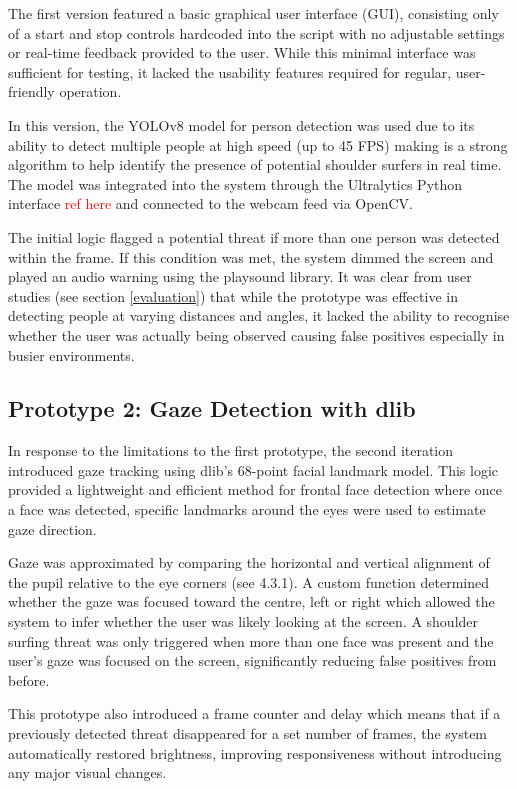 \documentclass[12pt]{article}
\theoremstyle{plain}
\theoremstyle{definition}
\begin{document}
The first version featured a basic graphical user interface (GUI), consisting only of a start and stop controls hardcoded into the script with no adjustable settings or real-time feedback provided to the user. While this minimal interface was sufficient for testing, it lacked the usability features required for regular, user-friendly operation.

In this version, the YOLOv8 model for person detection was used due to its ability to detect multiple people at high speed (up to 45 FPS) making is a strong algorithm to help identify the presence of potential shoulder surfers in real time. The model was integrated into the system through the Ultralytics Python interface \textcolor{red}{ref here} and connected to the webcam feed via OpenCV.

The initial logic flagged a potential threat if more than one person was detected within the frame. If this condition was met, the system dimmed the screen and played an audio warning using the playsound library. It was clear from user studies (see section \ref{evaluation}) that while the prototype was effective in detecting people at varying distances and angles, it lacked the ability to recognise whether the user was actually being observed causing false positives especially in busier environments.

\subsection{Prototype 2: Gaze Detection with dlib}
\label{prototype_2}

In response to the limitations to the first prototype, the second iteration introduced gaze tracking using dlib’s 68-point facial landmark model. This logic provided a lightweight and efficient method for frontal face detection where once a face was detected, specific landmarks around the eyes were used to estimate gaze direction.

Gaze was approximated by comparing the horizontal and vertical alignment of the pupil relative to the eye corners (see 4.3.1). A custom function determined whether the gaze was focused toward the centre, left or right which allowed the system to infer whether the user was likely looking at the screen. A shoulder surfing threat was only triggered when more than one face was present and the user’s gaze was focused on the screen, significantly reducing false positives from before.

This prototype also introduced a frame counter and delay which means that if a previously detected threat disappeared for a set number of frames, the system automatically restored brightness, improving responsiveness without introducing any major visual changes.
\end{document}

